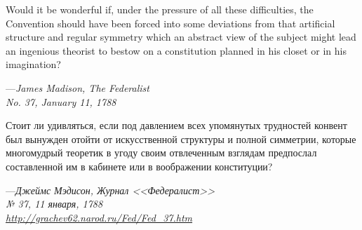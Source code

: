 \null
\vskip 1in

\begingroup
\raggedright
\list{}{\rightmargin=8pc \leftmargin=8pc}\item[] \small
Would it be wonderful if, under the pressure of all these difficulties,
the Convention should have been forced into some deviations from that
artificial structure and regular symmetry which an abstract view of the
subject might lead an ingenious theorist to bestow on a constitution
planned in his closet or in his imagination?
\par\vskip 4pt
\begin{tabbing}
---\=\emph{James Madison, The Federalist} \\
\>\emph{No. 37, January 11, 1788}
\end{tabbing}
\endlist
\endgroup

\newpage 

\null
\vskip 1in

\begingroup
\raggedright
\list{}{\rightmargin=8pc \leftmargin=8pc}\item[] \small
Стоит ли удивляться, если под давлением всех упомянутых трудностей конвент был
вынужден отойти от искусственной структуры и полной симметрии, которые
многомудрый теоретик в угоду своим отвлеченным взглядам предпослал составленной
им в кабинете или в воображении конституции?
\par\vskip 4pt
\begin{tabbing}
---\=\emph{Джеймс Мэдисон, Журнал <<Федералист>>} \\
\>\emph{№ 37, 11 января, 1788} \\
\>\emph{\href{http://grachev62.narod.ru/Fed/Fed\_37.htm}{http://grachev62.narod.ru/Fed/Fed\_37.htm}}
\end{tabbing}
\endlist
\endgroup

